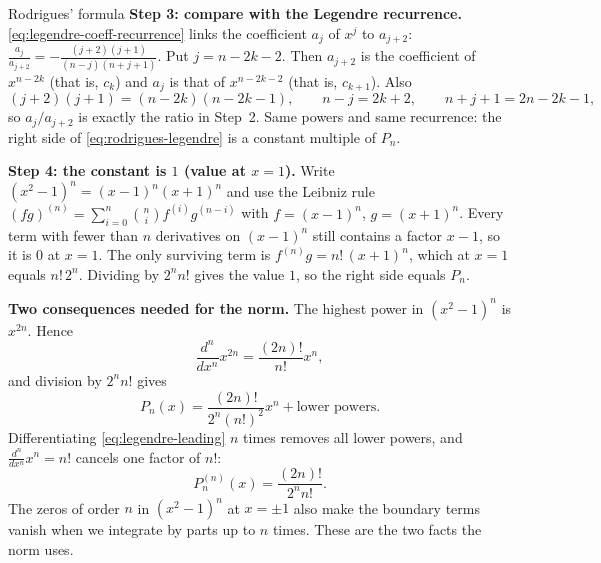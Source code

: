 \documentclass[11pt]{beamer}
\begin{document}
\begin{frame}[allowframebreaks=1.00]{Rodrigues' formula}
\textbf{Step 3: compare with the Legendre recurrence.} \eqref{eq:legendre-coeff-recurrence} links the coefficient \(a_j\)
of \(x^j\) to \(a_{j+2}\): \(\frac{a_j}{a_{j+2}}=-\frac{(j+2)(j+1)}{(n-j)(n+j+1)}\). Put \(j=n-2k-2\). Then \(a_{j+2}\) is the
coefficient of \(x^{n-2k}\) (that is, \(c_k\)) and \(a_j\) is that of \(x^{n-2k-2}\) (that is, \(c_{k+1}\)). Also
\[
 (j+2)(j+1)=(n-2k)(n-2k-1),\qquad n-j=2k+2,\qquad n+j+1=2n-2k-1,
\]
so \(a_j/a_{j+2}\) is exactly the ratio in Step~2. Same powers and same recurrence: the right side of
\eqref{eq:rodrigues-legendre} is a constant multiple of \(P_n\).
\par\framebreak\par
\textbf{Step 4: the constant is \(1\) (value at \(x=1\)).} Write \((x^2-1)^n=(x-1)^n(x+1)^n\) and use the Leibniz rule
\((fg)^{(n)}=\sum_{i=0}^{n}\binom ni f^{(i)}g^{(n-i)}\) with \(f=(x-1)^n\), \(g=(x+1)^n\). Every term with fewer than \(n\)
derivatives on \((x-1)^n\) still contains a factor \(x-1\), so it is \(0\) at \(x=1\). The only surviving term is
\(f^{(n)}g=n!\,(x+1)^n\), which at \(x=1\) equals \(n!\,2^n\). Dividing by \(2^nn!\) gives the value \(1\), so the
right side equals \(P_n\).

\smallskip
\textbf{Two consequences needed for the norm.}
The highest power in $(x^2-1)^n$ is $x^{2n}$. Hence
\[
 \frac{d^n}{dx^n}x^{2n}=\frac{(2n)!}{n!}x^n,
\]
and division by $2^n n!$ gives
\begin{equation}
 P_n(x)=\frac{(2n)!}{2^n(n!)^2}x^n+\text{lower powers}.
 \label{eq:legendre-leading}
\end{equation}
Differentiating \eqref{eq:legendre-leading} $n$ times removes all lower powers,
and $\frac{d^n}{dx^n}x^n=n!$ cancels one factor of $n!$:
\begin{equation}
 P_n^{(n)}(x)=\frac{(2n)!}{2^n n!}.
 \label{eq:legendre-nth-deriv}
\end{equation}
The zeros of order $n$ in $(x^2-1)^n$ at $x=\pm1$ also make the boundary terms
vanish when we integrate by parts up to $n$ times. These are the two facts the norm uses.

\end{frame}
\end{document}
